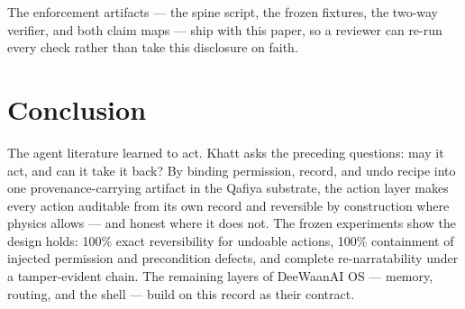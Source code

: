 \documentclass[11pt]{article}
\newcommand{\sys}{Khatt}
\begin{document}
The enforcement artifacts --- the spine script, the frozen fixtures, the
two-way verifier, and both claim maps --- ship with this paper, so a reviewer
can re-run every check rather than take this disclosure on faith.

\section{Conclusion}

The agent literature learned to act. \sys{} asks the preceding questions: may it
act, and can it take it back? By binding permission, record, and undo recipe into
one provenance-carrying artifact in the Qafiya substrate, the action layer makes
every action auditable from its own record and reversible by construction where
physics allows --- and honest where it does not. The frozen experiments show the
design holds: 100\% exact reversibility for undoable actions, 100\% containment
of injected permission and precondition defects, and complete re-narratability under a
tamper-evident chain. The remaining layers of DeeWaanAI OS --- memory, routing,
and the shell --- build on this record as their contract.
\end{document}
